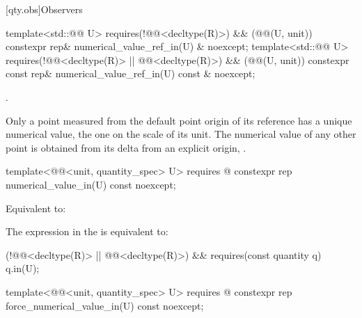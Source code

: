 [qty.obs]{Observers}

\begin{itemdecl}
template<std::@@ U>
  requires(!@@<decltype(R)>) && (@@(U{}, unit))
constexpr rep& numerical_value_ref_in(U) & noexcept;
template<std::@@ U>
  requires(!@@<decltype(R)> ||
           @@<decltype(R)>) && (@@(U{}, unit))
constexpr const rep& numerical_value_ref_in(U) const & noexcept;
\end{itemdecl}

\begin{itemdescr}
\pnum
\returns
{}.

\pnum
\begin{note}
Only a point measured from the default point origin of its reference
has a unique numerical value, the one on the scale of its unit.
The numerical value of any other point is obtained from its delta from an explicit origin,
.
\end{note}
\end{itemdescr}

\begin{itemdecl}
template<@@<unit, quantity_spec> U>
  requires @\seebelownc@
constexpr rep numerical_value_in(U) const noexcept;
\end{itemdecl}

\begin{itemdescr}
\pnum
\effects
Equivalent to:

\pnum
\remarks
The expression in the  is equivalent to:
\begin{codeblock}
(!@@<decltype(R)> || @@<decltype(R)>) &&
  requires(const quantity q) { q.in(U{}); }
\end{codeblock}
\end{itemdescr}

\begin{itemdecl}
template<@@<unit, quantity_spec> U>
  requires @\seebelownc@
constexpr rep force_numerical_value_in(U) const noexcept;
\end{itemdecl}

